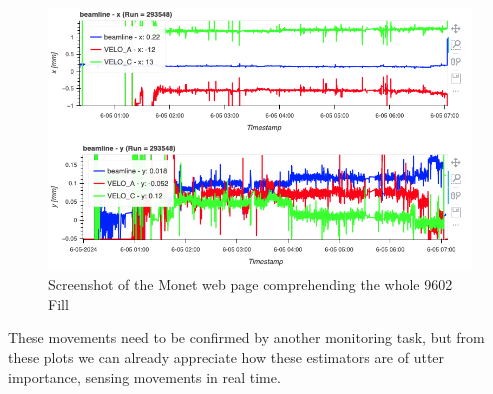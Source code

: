 \begin{figure}
    \centering
    \includegraphics[width=\textwidth]{figures/Fill9602.png}
    \caption{Screenshot of the Monet web page comprehending the whole 9602 Fill}
    \label{fig:fill9602}
\end{figure}

These movements need to be confirmed by another monitoring task, but from these plots we can already appreciate how these estimators are of utter importance, sensing movements in real time.